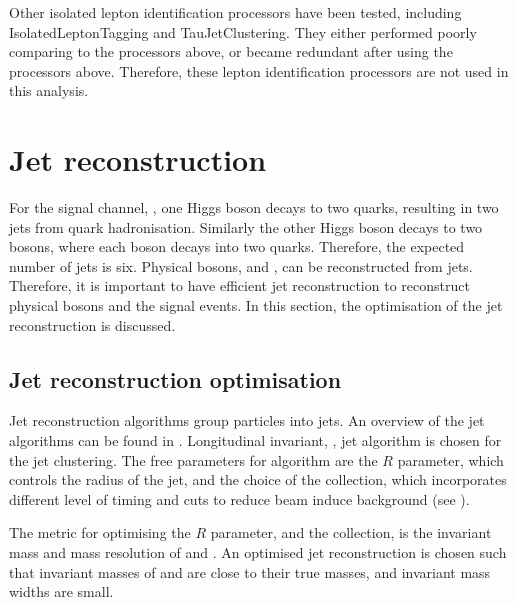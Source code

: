 Other isolated lepton identification processors have been tested, including IsolatedLeptonTagging and TauJetClustering. They either performed poorly comparing to the processors above, or became redundant after using the processors above. Therefore, these lepton identification processors are not used in this analysis.

\section{Jet reconstruction}

For the signal channel, \eeToHHbbWWHad, one Higgs boson decays to two \Pbottom quarks, resulting in two jets from quark hadronisation. Similarly the other Higgs boson decays to two \PW bosons, where each \PW boson decays into two quarks. Therefore, the expected number of jets is six.  Physical bosons,  \PW and \PHiggs, can be reconstructed from jets. Therefore, it is important to have efficient jet reconstruction to reconstruct physical bosons and the signal events. In this section, the optimisation of the jet reconstruction is discussed.


\subsection{Jet reconstruction optimisation}
\label{sec:doubleHiggsJetOptimisation}
Jet reconstruction algorithms group particles into jets. An overview of the jet algorithms can be found in . Longitudinal invariant, \kt, jet algorithm is chosen for the jet clustering. The free parameters for \kt algorithm are the $R$ parameter, which controls the radius of the jet, and the choice of the \PFO collection, which incorporates different level of timing and \pT cuts to reduce beam induce background (see ).

The metric for optimising the $R$ parameter, and the \PFO collection, is the invariant mass and mass resolution of \PHiggs and \PW. An optimised jet reconstruction is chosen such that invariant masses of \PHiggs and \PW are close to their true masses, and invariant mass widths are small.

